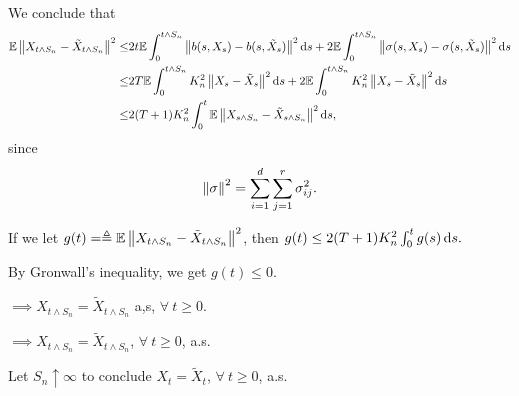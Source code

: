 {    We conclude that
    $$
    \begin{aligned}
    \mathbb{E} \left\|  X_{t \wedge S_n} - \tilde{X}_{t\wedge S_n}  \right\|^2 \leq & 2 t \mathbb{E}\int_0^{t \wedge S_n}\left\|  b(s,X_s) - b(s,\tilde{X}_s)  \right\|^2 \mathop{}\!\mathrm{d} s + 2 \mathbb{E}\int_0^{t \wedge S_n} \left\|  \sigma(s,X_s) - \sigma(s,\tilde{X}_s)  \right\|^2 \mathop{}\!\mathrm{d} s \\
    \leq & 2T \mathbb{E}\int_0^{t \wedge S_n} K_n^2 \left\|  X_s - \tilde{X}_s  \right\|^2 \mathop{}\!\mathrm{d} s + 2 \mathbb{E}\int_0^{t \wedge S_n} K_n^2 \left\|  X_s - \tilde{X}_s  \right\|^2 \mathop{}\!\mathrm{d} s \\
    \leq& 2(T+1)K_n^2 \int_0^t \mathbb{E}\left\|  X_{s\wedge S_n} - \tilde{X}_{s \wedge S_n}  \right\|^2 \mathop{}\!\mathrm{d} s,
    \end{aligned}
    $$
    since
    $$
    \left\|  \sigma  \right\|^2 = \sum_{i=1}^{d}\sum_{j=1}^{r} \sigma_{ij}^2.
    $$

    If we let $g(t ) = \triangleq \mathbb{E} \left\|  X_{t \wedge S_n} - \tilde{X}_{t \wedge S_n}  \right\|^2$, then $g(t) \leq 2(T+1)K_n^2 \int_0^t g(s) \mathop{}\!\mathrm{d} s.$

    By Gronwall's inequality, we get $g(t) \leq 0$.
    
    $\implies X_{t \wedge S_n} = \tilde{X}_{t \wedge S_n}$ a,s, $\forall~ t \geq 0$.

    $\implies X_{t \wedge S_n} = \tilde{X}_{t \wedge S_n}$, $\forall~t \geq 0$, a.s.

    Let $S_n \uparrow \infty$ to conclude $X_t = \tilde{X}_t$, $\forall
    ~ t \geq 0$, a.s.
}



